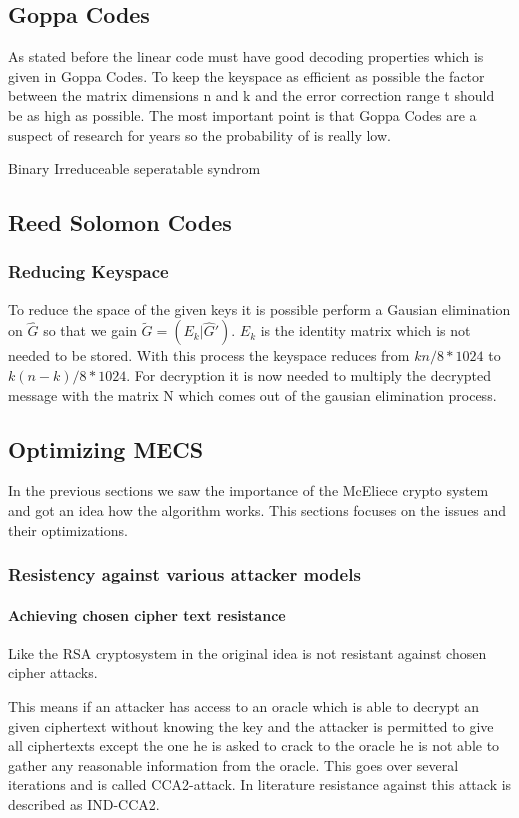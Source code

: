 \subsection*{Goppa Codes}
As stated before the linear code must have good decoding properties which is given in Goppa Codes. To keep the keyspace as efficient as possible the factor between the matrix dimensions n and k and the error correction range t should be as high as possible. The most important point is that Goppa Codes are a suspect of research for years so the probability of is really low. 

Binary
Irreduceable
seperatable
syndrom
\subsection*{Reed Solomon Codes}

\subsubsection{Reducing Keyspace}
To reduce the space of the given keys it is possible perform a Gausian elimination on $\hat{G}$ so that we gain $\tilde{G} = (E_{k}|\hat{G}')$. $E_{k}$ is the identity matrix which is not needed to be stored. With this process the keyspace reduces from $kn / 8 * 1024$ to $k(n-k) / 8 * 1024$.
For decryption it is now needed to multiply the decrypted message with the matrix N which comes out of the gausian elimination process. 
\subsection{Optimizing MECS}
In the previous sections we saw the importance of the McEliece crypto system and got an idea how the algorithm works. This sections focuses on the issues and their optimizations. 
\subsubsection{Resistency against various attacker models}
\paragraph{Achieving chosen cipher text resistance}

Like the RSA cryptosystem in the original idea is not resistant against chosen cipher attacks. 

This means if an attacker has access to an oracle which is able to decrypt an given ciphertext without knowing the key and the attacker is permitted to give all ciphertexts except the one he is asked to crack to the oracle he is not able to gather any reasonable information from the oracle. This goes over several iterations and is called CCA2-attack. In literature resistance against this attack is described as IND-CCA2. 

